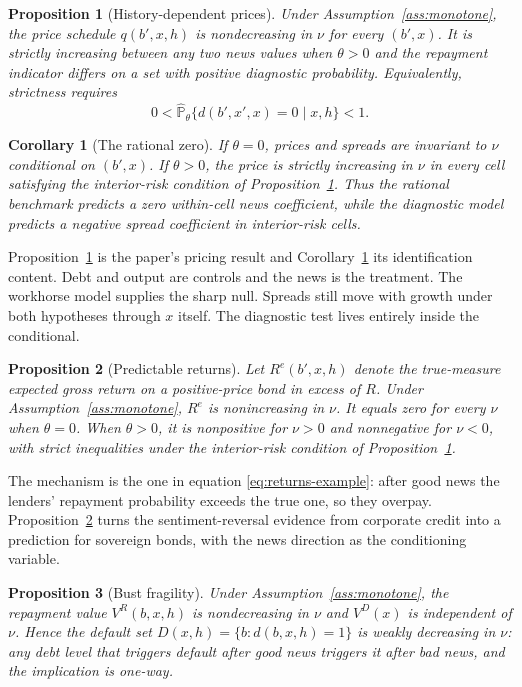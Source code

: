 \documentclass[11pt]{article}
\newtheorem{proposition}{Proposition}
\newtheorem{corollary}{Corollary}
\theoremstyle{definition}
\newcommand{\Prob}{\mathbb{P}}
\begin{document}
\begin{proposition}[History-dependent prices]\label{prop:history}
Under Assumption~\ref{ass:monotone}, the price schedule $q(b', x, h)$ is nondecreasing in $\nu$ for every $(b', x)$. It is strictly increasing between any two news values when $\theta>0$ and the repayment indicator differs on a set with positive diagnostic probability. Equivalently, strictness requires
\[
0<\widehat{\Prob}_\theta\{d(b',x',x)=0\mid x,h\}<1.
\]
\end{proposition}

\begin{corollary}[The rational zero]\label{cor:zero}
If $\theta=0$, prices and spreads are invariant to $\nu$ conditional on $(b',x)$. If $\theta>0$, the price is strictly increasing in $\nu$ in every cell satisfying the interior-risk condition of Proposition~\ref{prop:history}. Thus the rational benchmark predicts a zero within-cell news coefficient, while the diagnostic model predicts a negative spread coefficient in interior-risk cells.
\end{corollary}

Proposition~\ref{prop:history} is the paper's pricing result and Corollary~\ref{cor:zero} its identification content. Debt and output are controls and the news is the treatment. The workhorse model supplies the sharp null. Spreads still move with growth under both hypotheses through $x$ itself. The diagnostic test lives entirely inside the conditional.

\begin{proposition}[Predictable returns]\label{prop:returns}
Let $R^e(b', x, h)$ denote the true-measure expected gross return on a positive-price bond in excess of $R$. Under Assumption~\ref{ass:monotone}, $R^e$ is nonincreasing in $\nu$. It equals zero for every $\nu$ when $\theta=0$. When $\theta>0$, it is nonpositive for $\nu>0$ and nonnegative for $\nu<0$, with strict inequalities under the interior-risk condition of Proposition~\ref{prop:history}.
\end{proposition}

The mechanism is the one in equation \eqref{eq:returns-example}: after good news the lenders' repayment probability exceeds the true one, so they overpay. Proposition~\ref{prop:returns} turns the sentiment-reversal evidence from corporate credit \citep{GreenwoodHanson2013, LopezSalidoSteinZakrajsek2017} into a prediction for sovereign bonds, with the news direction as the conditioning variable.

\begin{proposition}[Bust fragility]\label{prop:fragility}
Under Assumption~\ref{ass:monotone}, the repayment value $V^R(b, x, h)$ is nondecreasing in $\nu$ and $V^D(x)$ is independent of $\nu$. Hence the default set $D(x, h) = \{ b : d(b, x, h) = 1 \}$ is weakly decreasing in $\nu$: any debt level that triggers default after good news triggers it after bad news, and the implication is one-way.
\end{proposition}
\end{document}
